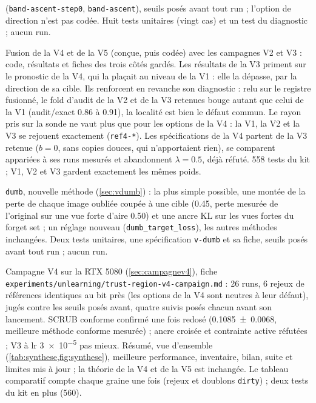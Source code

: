 \documentclass[11pt,a4paper]{article}
\newcommand{\code}[1]{\texttt{#1}}
\newcommand{\chemin}[1]{\nolinkurl{#1}}%
\begin{document}
\begin{description}[leftmargin=1.2em,font=\sffamily\bfseries\color{bleu}]
    (\code{band-ascent-step0}, \code{band-ascent}), seuils posés avant tout run ; l'option de
    direction n'est pas codée. Huit tests unitaires (vingt cas) et un test du diagnostic ; aucun run.
  \item[22 novembre 2026, quatrième fusion] Fusion de la V4 et de la V5 (conçue, puis codée) avec les
    campagnes V2 et V3 : code, résultats et fiches des trois côtés gardés. Les résultats de la V3 priment sur le pronostic de la
    V4, qui la plaçait au niveau de la V1 : elle la dépasse, par la direction de sa cible. Ils
    renforcent en revanche son diagnostic : relu sur le registre fusionné, le fold d'audit de la V2
    et de la V3 retenues bouge autant que celui de la V1 (audit/exact \num{0.86} à \num{0.91}), la
    localité est bien le défaut commun. Le rayon pris sur la sonde ne vaut plus que pour les options
    de la V4 : la V1, la V2 et la V3 se rejouent exactement (\code{ref4-*}). Les spécifications de la
    V4 partent de la V3 retenue ($b=0$, sans copies douces, qui n'apportaient rien), se comparent
    appariées à ses runs mesurés et abandonnent $\lambda=\num{0.5}$, déjà réfuté. 558 tests du kit ; V1, V2
    et V3 gardent exactement les mêmes poids.
  \item[22 novembre 2026, V\_Dumb] \code{dumb}, nouvelle méthode (\cref{sec:vdumb}) : la plus simple
    possible, une montée de la perte de chaque image oubliée coupée à une cible (\num{0.45}, perte
    mesurée de l'original sur une vue forte d'aire \num{0.50}) et une ancre KL sur les vues fortes du
    forget set ; un réglage nouveau (\code{dumb\_target\_loss}), les autres méthodes inchangées. Deux
    tests unitaires, une spécification \code{v-dumb} et sa fiche, seuils posés avant tout run ; aucun
    run.
  \item[22 novembre 2026, campagne V4] Campagne V4 sur la RTX 5080 (\cref{sec:campagnev4}), fiche
    \chemin{experiments/unlearning/trust-region-v4-campaign.md} : 26 runs, 6 rejeux de références
    identiques au bit près (les options de la V4 sont neutres à leur défaut), jugés contre les seuils
    posés avant, quatre suivis posés chacun avant son lancement. SCRUB conforme confirmé une fois
    redosé (\num{0.1085 +- 0.0068}, meilleure méthode conforme mesurée) ; ancre croisée et
    contrainte active réfutées ; V3 à lr \num{3e-5} pas mieux. Résumé, vue d'ensemble
    (\cref{tab:synthese,fig:synthese}), meilleure performance, inventaire, bilan, suite et limites mis
    à jour ; la théorie de la V4 et de la V5 est inchangée. Le tableau comparatif compte chaque graine
    une fois (rejeux et doublons \code{dirty}) ; deux tests du kit en plus (560).

\end{description}
\end{document}
